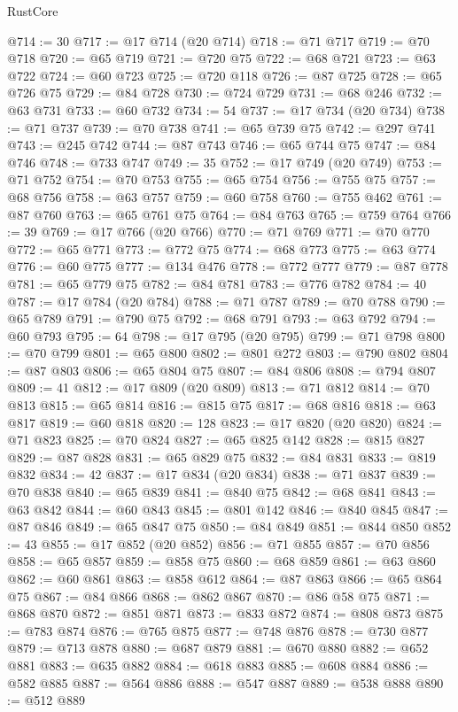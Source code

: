 \begin{lexlean}{RustCore}
\begin{coremodule}
@714 := 30
@717 := @17 @714 (@20 @714)
@718 := @71 @717
@719 := @70 @718
@720 := @65 @719
@721 := @720 @75
@722 := @68 @721
@723 := @63 @722
@724 := @60 @723
@725 := @720 @118
@726 := @87 @725
@728 := @65 @726 @75
@729 := @84 @728
@730 := @724 @729
@731 := @68 @246
@732 := @63 @731
@733 := @60 @732
@734 := 54
@737 := @17 @734 (@20 @734)
@738 := @71 @737
@739 := @70 @738
@741 := @65 @739 @75
@742 := @297 @741
@743 := @245 @742
@744 := @87 @743
@746 := @65 @744 @75
@747 := @84 @746
@748 := @733 @747
@749 := 35
@752 := @17 @749 (@20 @749)
@753 := @71 @752
@754 := @70 @753
@755 := @65 @754
@756 := @755 @75
@757 := @68 @756
@758 := @63 @757
@759 := @60 @758
@760 := @755 @462
@761 := @87 @760
@763 := @65 @761 @75
@764 := @84 @763
@765 := @759 @764
@766 := 39
@769 := @17 @766 (@20 @766)
@770 := @71 @769
@771 := @70 @770
@772 := @65 @771
@773 := @772 @75
@774 := @68 @773
@775 := @63 @774
@776 := @60 @775
@777 := @134 @476
@778 := @772 @777
@779 := @87 @778
@781 := @65 @779 @75
@782 := @84 @781
@783 := @776 @782
@784 := 40
@787 := @17 @784 (@20 @784)
@788 := @71 @787
@789 := @70 @788
@790 := @65 @789
@791 := @790 @75
@792 := @68 @791
@793 := @63 @792
@794 := @60 @793
@795 := 64
@798 := @17 @795 (@20 @795)
@799 := @71 @798
@800 := @70 @799
@801 := @65 @800
@802 := @801 @272
@803 := @790 @802
@804 := @87 @803
@806 := @65 @804 @75
@807 := @84 @806
@808 := @794 @807
@809 := 41
@812 := @17 @809 (@20 @809)
@813 := @71 @812
@814 := @70 @813
@815 := @65 @814
@816 := @815 @75
@817 := @68 @816
@818 := @63 @817
@819 := @60 @818
@820 := 128
@823 := @17 @820 (@20 @820)
@824 := @71 @823
@825 := @70 @824
@827 := @65 @825 @142
@828 := @815 @827
@829 := @87 @828
@831 := @65 @829 @75
@832 := @84 @831
@833 := @819 @832
@834 := 42
@837 := @17 @834 (@20 @834)
@838 := @71 @837
@839 := @70 @838
@840 := @65 @839
@841 := @840 @75
@842 := @68 @841
@843 := @63 @842
@844 := @60 @843
@845 := @801 @142
@846 := @840 @845
@847 := @87 @846
@849 := @65 @847 @75
@850 := @84 @849
@851 := @844 @850
@852 := 43
@855 := @17 @852 (@20 @852)
@856 := @71 @855
@857 := @70 @856
@858 := @65 @857
@859 := @858 @75
@860 := @68 @859
@861 := @63 @860
@862 := @60 @861
@863 := @858 @612
@864 := @87 @863
@866 := @65 @864 @75
@867 := @84 @866
@868 := @862 @867
@870 := @86 @58 @75
@871 := @868 @870
@872 := @851 @871
@873 := @833 @872
@874 := @808 @873
@875 := @783 @874
@876 := @765 @875
@877 := @748 @876
@878 := @730 @877
@879 := @713 @878
@880 := @687 @879
@881 := @670 @880
@882 := @652 @881
@883 := @635 @882
@884 := @618 @883
@885 := @608 @884
@886 := @582 @885
@887 := @564 @886
@888 := @547 @887
@889 := @538 @888
@890 := @512 @889

\end{coremodule}
\end{lexlean}
